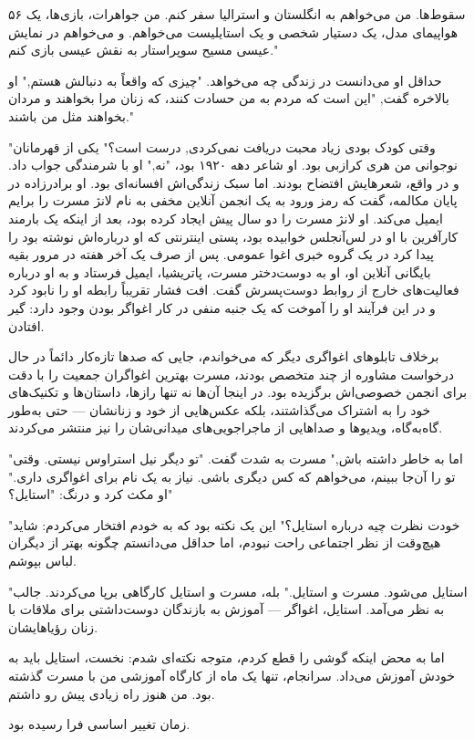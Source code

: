 ۵۶
سقوط‌ها. من می‌خواهم به انگلستان و استرالیا سفر کنم. من جواهرات، بازی‌ها، یک هواپیمای مدل، یک دستیار شخصی و یک استایلیست می‌خواهم. و می‌خواهم در نمایش عیسی مسیح سوپراستار به نقش عیسی بازی کنم."

حداقل او می‌دانست در زندگی چه می‌خواهد. "چیزی که واقعاً به دنبالش هستم," او بالاخره گفت, "این است که مردم به من حسادت کنند، که زنان مرا بخواهند و مردان بخواهند مثل من باشند."

"وقتی کودک بودی زیاد محبت دریافت نمی‌کردی, درست است؟" یکی از قهرمانان نوجوانی من هری کرازبی بود. او شاعر دهه ۱۹۲۰ بود،
"نه," او با شرمندگی جواب داد. و در واقع، شعرهایش افتضاح بودند. اما سبک زندگی‌اش افسانه‌ای بود. او برادرزاده
در پایان مکالمه، گفت که رمز ورود به یک انجمن آنلاین مخفی به نام لانژ مسرت را برایم ایمیل می‌کند. او لانژ مسرت را دو سال پیش ایجاد کرده بود، بعد از اینکه یک بارمند کارآفرین با او در لس‌آنجلس خوابیده بود، پستی اینترنتی که او درباره‌اش نوشته بود را پیدا کرد در یک گروه خبری اغوا عمومی. پس از صرف یک آخر هفته در مرور بقیه بایگانی آنلاین او، او به دوست‌دختر مسرت، پاتریشیا، ایمیل فرستاد و به او درباره فعالیت‌های خارج از روابط دوست‌پسرش گفت. افت فشار تقریباً رابطه او را نابود کرد و در این فرآیند او را آموخت که یک جنبه منفی در کار اغواگر بودن وجود دارد: گیر افتادن.

برخلاف تابلوهای اغواگری دیگر که می‌خواندم، جایی که صدها تازه‌کار دائماً در حال درخواست مشاوره از چند متخصص بودند، مسرت بهترین اغواگران جمعیت را با دقت برای انجمن خصوصی‌اش برگزیده بود. در اینجا آن‌ها نه تنها رازها، داستان‌ها و تکنیک‌های خود را به اشتراک می‌گذاشتند، بلکه عکس‌هایی از خود و زنانشان — حتی به‌طور گاه‌به‌گاه، ویدیوها و صداهایی از ماجراجویی‌های میدانی‌شان را نیز منتشر می‌کردند. 

"اما به خاطر داشته باش," مسرت به شدت گفت. "تو دیگر نیل استراوس نیستی. وقتی تو را آن‌جا ببینم، می‌خواهم که کس دیگری باشی. نیاز به یک نام برای اغواگری داری." او مکث کرد و درنگ: "استایل؟"

"خودت نظرت چیه درباره استایل؟" این یک نکته بود که به خودم افتخار می‌کردم: شاید هیچ‌وقت از نظر اجتماعی راحت نبودم، اما حداقل می‌دانستم چگونه بهتر از دیگران لباس بپوشم.

"استایل می‌شود. مسرت و استایل." بله، مسرت و استایل کارگاهی برپا می‌کردند. جالب به نظر می‌آمد. استایل، اغواگر — آموزش به بازندگان دوست‌داشتی برای ملاقات با زنان رؤیاهایشان.

اما به محض اینکه گوشی را قطع کردم، متوجه نکته‌ای شدم: نخست، استایل باید به خودش آموزش می‌داد. سرانجام، تنها یک ماه از کارگاه آموزشی من با مسرت گذشته بود. من هنوز راه زیادی پیش رو داشتم.

زمان تغییر اساسی فرا رسیده بود.